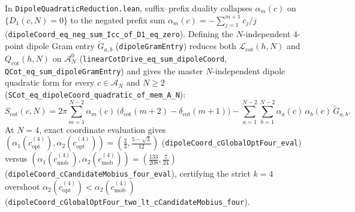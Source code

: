 \documentclass[11pt,a4paper]{article}
\theoremstyle{definition}
\begin{document}
In \texttt{Dipole\allowbreak Quadratic\allowbreak Reduction.lean}, suffix--prefix duality collapses $\alpha_m(c)$ on $\{D_1(c, N) = 0\}$ to the negated prefix sum $\alpha_m(c) = -\sum_{j=1}^{m+1} c_j/j$ (\texttt{dipole\allowbreak Coord\_\allowbreak eq\_\allowbreak neg\_\allowbreak sum\_\allowbreak Icc\_\allowbreak of\_\allowbreak D1\_\allowbreak eq\_\allowbreak zero}). Defining the $N$-independent $4$-point dipole Gram entry $\widetilde{G}_{a,b}$ (\texttt{dipole\allowbreak Gram\allowbreak Entry}) reduces both $\mathcal{L}_{\mathrm{cot}}(h, N)$ and $Q_{\mathrm{cot}}(h, N)$ on $\mathcal{A}_N^0$ (\texttt{linear\allowbreak Cot\allowbreak Drive\_\allowbreak eq\_\allowbreak sum\_\allowbreak dipole\allowbreak Coord}, \texttt{QCot\_\allowbreak eq\_\allowbreak sum\_\allowbreak dipole\allowbreak Gram\allowbreak Entry}) and gives the master $N$-independent dipole quadratic form for every $c \in \mathcal{A}_N$ and $N \ge 2$ (\texttt{SCot\_\allowbreak eq\_\allowbreak dipole\allowbreak Coord\_\allowbreak quadratic\_\allowbreak of\_\allowbreak mem\_\allowbreak A\_\allowbreak N}):
\begin{equation}
S_{\mathrm{cot}}(c, N) = 2\pi \sum_{m=1}^{N-2} \alpha_m(c)\,\big(\delta_{\mathrm{cot}}(m+2) - \delta_{\mathrm{cot}}(m+1)\big) - \sum_{a=1}^{N-2}\sum_{b=1}^{N-2} \alpha_a(c)\,\alpha_b(c)\,\widetilde{G}_{a,b}.
\end{equation}
At $N = 4$, exact coordinate evaluation gives $(\alpha_1(c_{\mathrm{opt}}^{(4)}), \alpha_2(c_{\mathrm{opt}}^{(4)})) = (\tfrac{2}{3}, \tfrac{5-\sqrt{3}}{12})$ (\texttt{dipole\allowbreak Coord\_\allowbreak cGlobal\allowbreak Opt\allowbreak Four\_\allowbreak eval}) versus $(\alpha_1(c_{\mathrm{mob}}^{(4)}), \alpha_2(c_{\mathrm{mob}}^{(4)})) = (\tfrac{133}{208}, \tfrac{7}{24})$ (\texttt{dipole\allowbreak Coord\_\allowbreak cCandidate\allowbreak Mobius\_\allowbreak four\_\allowbreak eval}), certifying the strict $k = 4$ overshoot $\alpha_2(c_{\mathrm{opt}}^{(4)}) < \alpha_2(c_{\mathrm{mob}}^{(4)})$ (\texttt{dipole\allowbreak Coord\_\allowbreak cGlobal\allowbreak Opt\allowbreak Four\_\allowbreak two\_\allowbreak lt\_\allowbreak cCandidate\allowbreak Mobius\_\allowbreak four}).
\end{document}
